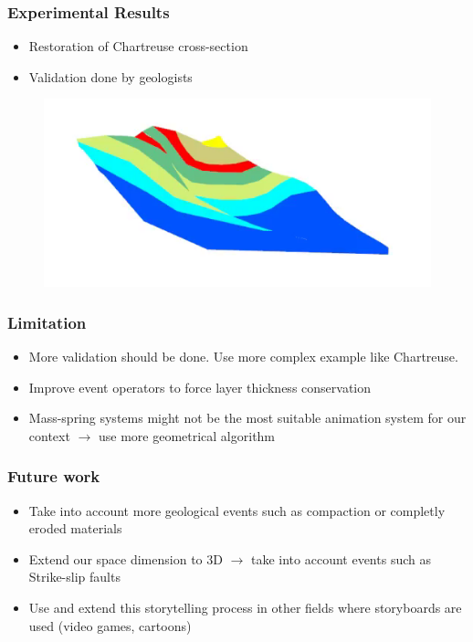 \documentclass{beamer}
\begin{document}
	\begin{frame}
	\frametitle{Experimental Results}
	\begin{itemize}
	\item Restoration of Chartreuse cross-section
	\item Validation done by geologists 
	\end{itemize}
	\begin{figure}[H]
	\centering
	\href{chartreuseDroite-rev.mp4}
{\includegraphics[width=.65\textwidth]{chartreusedroite0.png}}
	\end{figure}
	\end{frame}
	
	\begin{frame}
	\frametitle{Limitation}
	\begin{itemize}
	\item More validation should be done. Use more complex example like Chartreuse.
	\item Improve event operators to force layer thickness conservation 
	\item Mass-spring systems might not be the most suitable animation system for our context $\longrightarrow$ use more geometrical algorithm
	\end{itemize}
	\end{frame}
	
	\begin{frame}
	\frametitle{Future work}
	\begin{itemize}
	\item Take into account more geological events such as compaction or completly eroded materials
	\item Extend our space dimension to 3D $\longrightarrow$ take into account events such as Strike-slip faults
	\item Use and extend this storytelling process in other fields where storyboards are used (video games, cartoons)
	\end{itemize}
	\end{frame}
	
\end{document}
